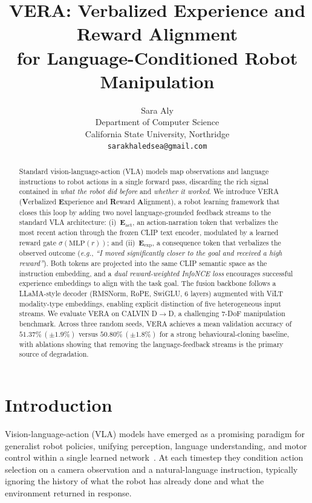 \documentclass{article}
\title{\textsc{VERA}: Verbalized Experience and Reward Alignment\\
       for Language-Conditioned Robot Manipulation}
\author{%
  Sara Aly \\
  Department of Computer Science\\
  California State University, Northridge\\
  \texttt{sarakhaledsea@gmail.com} \\
}
\newcommand{\vera}{\textsc{VERA}}
\newcommand{\eact}{$\mathbf{E}_\text{act}$}
\newcommand{\eexp}{$\mathbf{E}_\text{exp}$}
\newcommand{\eg}{\textit{e.g.}}
\begin{document}
\maketitle

\begin{abstract}
Standard vision-language-action (VLA) models map observations and language instructions
to robot actions in a single forward pass, discarding the rich signal contained in
\emph{what the robot did before} and \emph{whether it worked}.
We introduce \vera{} (\textbf{V}erbalized \textbf{E}xperience and \textbf{R}eward \textbf{A}lignment),
a robot learning framework that closes this loop by adding two novel language-grounded
feedback streams to the standard VLA architecture:
(i)~\eact{}, an action-narration token that verbalizes the most recent action through the
frozen CLIP text encoder, modulated by a learned reward gate $\sigma(\text{MLP}(r))$; and
(ii)~\eexp{}, a consequence token that verbalizes the observed outcome
(\eg, \textit{``I moved significantly closer to the goal and received a high reward''}).
Both tokens are projected into the same CLIP semantic space as the instruction embedding,
and a \emph{dual reward-weighted InfoNCE loss} encourages successful
experience embeddings to align with the task goal.
The fusion backbone follows a LLaMA-style decoder (RMSNorm, RoPE, SwiGLU, 6 layers)
augmented with ViLT modality-type embeddings, enabling explicit distinction of five
heterogeneous input streams.
We evaluate \vera{} on CALVIN D$\rightarrow$D, a challenging 7-DoF manipulation benchmark.
Across three random seeds, \vera{} achieves a mean validation accuracy of
$51.37\%\,(\pm1.9\%)$ versus $50.80\%\,(\pm1.8\%)$ for a strong behavioural-cloning
baseline, with ablations showing that removing the language-feedback streams is the
primary source of degradation.
\end{abstract}

\section{Introduction}
\label{sec:intro}

Vision-language-action (VLA) models have emerged as a promising paradigm for
generalist robot policies, unifying perception, language understanding, and motor
control within a single learned network~\citep{rt2, octo, openVLA}.
At each timestep they condition action selection on a camera observation and a
natural-language instruction, typically ignoring the history of what the robot has
already done and what the environment returned in response.
\end{document}
